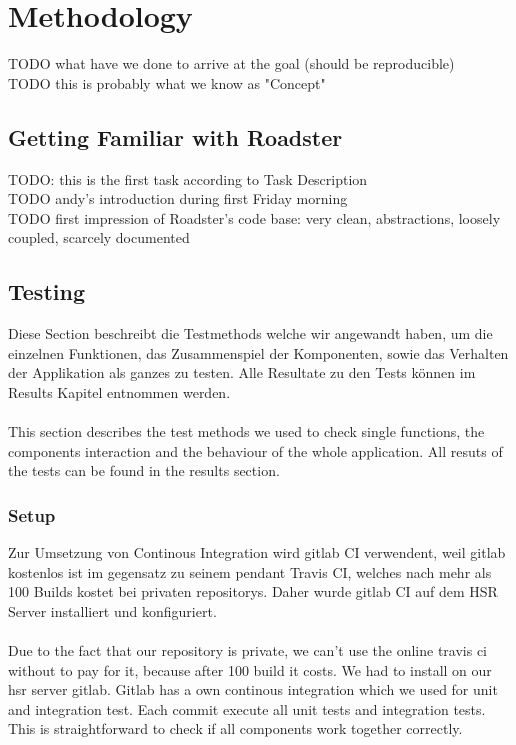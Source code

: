 \chapter{Methodology}
TODO what have we done to arrive at the goal (should be reproducible)\\
TODO this is probably what we know as "Concept"\\


\section{Getting Familiar with Roadster}
TODO: this is the first task according to Task Description\\
TODO andy's introduction during first Friday morning\\
TODO first impression of Roadster's code base: very clean, abstractions, loosely coupled, scarcely documented

\section{Testing}
Diese Section beschreibt die Testmethods welche wir angewandt haben, um die 
einzelnen Funktionen, das Zusammenspiel der Komponenten, sowie das Verhalten 
der Applikation als ganzes zu testen. Alle Resultate zu den Tests können im 
Results Kapitel entnommen werden.\\
\\
This section describes the test methods we used to check single functions, 
the components interaction and the behaviour of the whole application.
All resuts of the tests can be found in the results section.

\subsection{Setup}
Zur Umsetzung von Continous Integration wird gitlab CI verwendent, weil gitlab
kostenlos ist im gegensatz zu seinem pendant Travis CI, welches nach mehr als 100
Builds kostet bei privaten repositorys. 
Daher wurde gitlab CI auf dem HSR Server installiert und konfiguriert.\\
\\
Due to the fact that our repository is private, we can't use the online 
travis ci without to pay for it, because after 100 build it costs.
We had to install on our hsr server gitlab. Gitlab has a own continous integration 
which we used for unit and integration test. Each commit execute all unit tests and 
integration tests. This is straightforward to check if all components work together correctly.

